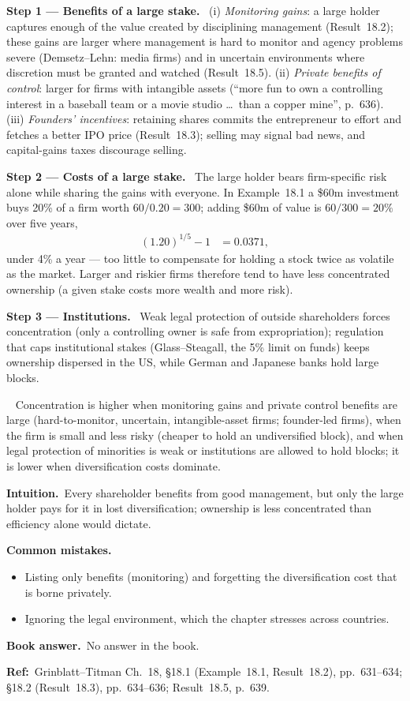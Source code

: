 \documentclass[11pt,a4paper]{article}
\newcommand{\step}[2]{\par\medskip\noindent\textbf{Step #1 --- #2.}~}
\newcommand{\intuition}{\par\medskip\noindent\textbf{Intuition.}~}
\newcommand{\bookans}{\par\medskip\noindent\textbf{Book answer.}~}
\newcommand{\refbib}{\par\smallskip\noindent\textbf{Ref:}~}
\newcommand{\answer}[1]{\par\smallskip\noindent\fbox{\textbf{Answer #1.}}~}
\newcommand{\pitfalls}{\par\medskip\noindent\textbf{Common mistakes.}}
\begin{document}
\step{1}{Benefits of a large stake} (i) \emph{Monitoring gains}: a large holder captures enough of the value created by disciplining management (Result~18.2); these gains are larger where management is hard to monitor and agency problems severe (Demsetz--Lehn: media firms) and in uncertain environments where discretion must be granted and watched (Result~18.5). (ii) \emph{Private benefits of control}: larger for firms with intangible assets (``more fun to own a controlling interest in a baseball team or a movie studio \ldots\ than a copper mine'', p.~636). (iii) \emph{Founders' incentives}: retaining shares commits the entrepreneur to effort and fetches a better IPO price (Result~18.3); selling may signal bad news, and capital-gains taxes discourage selling.

\step{2}{Costs of a large stake} The large holder bears firm-specific risk alone while sharing the gains with everyone. In Example~18.1 a \$60m investment buys 20\% of a firm worth $60/0.20=300$; adding \$60m of value is $60/300=20\%$ over five years,
\begin{align}
  (1.20)^{1/5}-1 &= 0.0371, \label{r8e3-ann}
\end{align}
under 4\% a year --- too little to compensate for holding a stock twice as volatile as the market. Larger and riskier firms therefore tend to have less concentrated ownership (a given stake costs more wealth and more risk).

\step{3}{Institutions} Weak legal protection of outside shareholders forces concentration (only a controlling owner is safe from expropriation); regulation that caps institutional stakes (Glass--Steagall, the 5\% limit on funds) keeps ownership dispersed in the US, while German and Japanese banks hold large blocks.

\answer{} Concentration is higher when monitoring gains and private control benefits are large (hard-to-monitor, uncertain, intangible-asset firms; founder-led firms), when the firm is small and less risky (cheaper to hold an undiversified block), and when legal protection of minorities is weak or institutions are allowed to hold blocks; it is lower when diversification costs dominate.

\intuition Every shareholder benefits from good management, but only the large holder pays for it in lost diversification; ownership is less concentrated than efficiency alone would dictate.

\pitfalls
\begin{itemize}
  \item Listing only benefits (monitoring) and forgetting the diversification cost that is borne privately.
  \item Ignoring the legal environment, which the chapter stresses across countries.
\end{itemize}
\bookans No answer in the book.
\refbib{Grinblatt--Titman Ch.~18, \S18.1 (Example~18.1, Result~18.2), pp.~631--634; \S18.2 (Result~18.3), pp.~634--636; Result~18.5, p.~639.}
\end{document}
